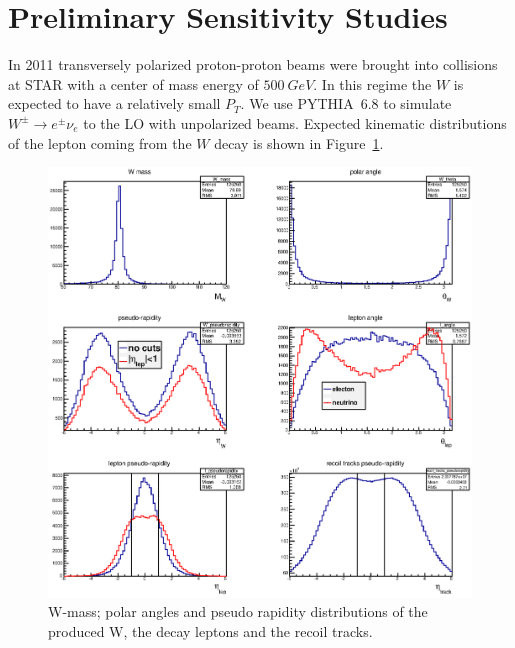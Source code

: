 \documentclass[12pt]{article}
\begin{document}

\section{Preliminary Sensitivity Studies}

In 2011 transversely polarized proton-proton beams were brought into collisions
at STAR with a center of mass energy of $500~GeV$. In this regime the $W$ is
expected to have a relatively small $P_T$. 
We use PYTHIA~6.8 to
simulate $W^\pm \to e^\pm \nu_e$ to the LO with unpolarized beams. Expected
kinematic distributions of the lepton coming from the $W$ decay is shown in
Figure~\ref{fig:MC_W_eta}.


\begin{figure}[htbp]
\begin{center}
\includegraphics[width=14cm]{images/W_rapidity}
\end{center}
\caption{W-mass; polar angles and pseudo rapidity distributions of the produced W, the decay leptons and the recoil tracks.}
\label{fig:MC_W_eta} 
\end{figure}
\end{document}
